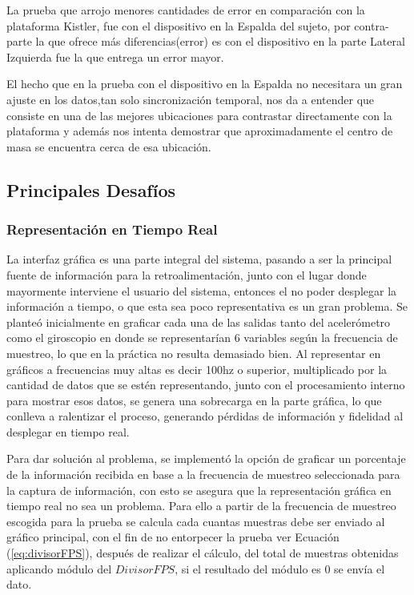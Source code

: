 \documentclass[12pt,a4paper]{article}
\begin{document}
La prueba que arrojo menores cantidades de error en comparación con la plataforma Kistler, fue con el dispositivo en la Espalda del sujeto, por contra-parte la que ofrece más diferencias(error) es con el dispositivo en la parte Lateral Izquierda fue la que entrega un error mayor.

El hecho que en la prueba con el dispositivo en la Espalda no necesitara un gran ajuste en los datos,tan solo sincronización temporal, nos da a entender que consiste en una de las mejores ubicaciones para contrastar directamente con la plataforma y además nos intenta demostrar que aproximadamente el centro de masa se encuentra cerca de esa ubicación.


\newpage
\subsection{Principales Desafíos}
\subsubsection{Representación en Tiempo Real}
La interfaz gráfica es una parte integral del sistema, pasando a ser la principal fuente de información para la retroalimentación, junto con el lugar donde mayormente interviene el usuario del sistema, entonces el no poder desplegar la información a tiempo, o que esta sea poco representativa es un gran problema. Se planteó inicialmente en graficar cada una de las salidas tanto del acelerómetro como el giroscopio en donde se representarían 6 variables según la frecuencia de muestreo, lo que en la práctica no resulta demasiado bien. Al representar en gráficos a frecuencias muy altas es decir 100hz o superior, multiplicado por la cantidad de datos que se estén representando, junto con el procesamiento interno para mostrar esos datos, se genera una sobrecarga en la parte gráfica, lo que conlleva a ralentizar el proceso, generando pérdidas de información y fidelidad al desplegar en tiempo real.

Para dar solución al problema, se implementó la opción de graficar un porcentaje de la información recibida en base a la frecuencia de muestreo seleccionada para la captura de información, con esto se asegura que la representación gráfica en tiempo real no sea un problema. Para ello a partir de la frecuencia de muestreo escogida para la prueba se calcula cada cuantas muestras debe ser enviado al gráfico principal, con el fin de no entorpecer la prueba ver Ecuación (\ref{eq:divisorFPS}), después de realizar el cálculo, del total de muestras obtenidas aplicando módulo del $DivisorFPS$, si el resultado del módulo es 0 se envía el dato.
\end{document}
